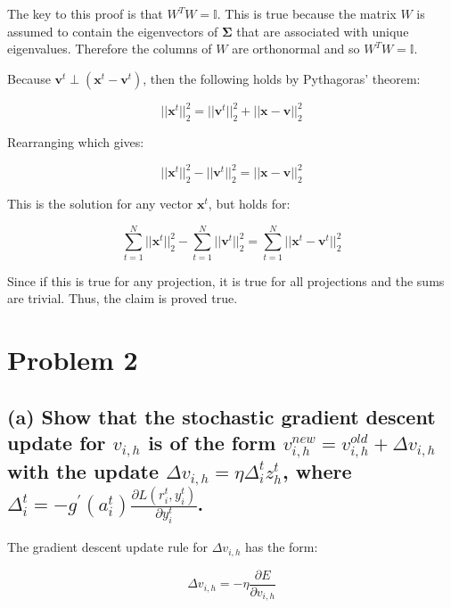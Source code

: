 \documentclass{article}
\begin{document}
The key to this proof is that $W^TW = \mathbb{I}$.  This is true because the matrix $W$ is assumed to contain the eigenvectors of $\mathbf{\Sigma}$ that are associated with unique eigenvalues.  Therefore the columns of $W$ are orthonormal and so $W^TW = \mathbb{I}$.

Because $  \mathbf{v}^t \perp (\mathbf{x}^t - \mathbf{v}^t) $, then the following holds by Pythagoras' theorem:

\begin{equation}
|| \mathbf{x}^t ||_2^2 = || \mathbf{v}^t ||_2^2 + || \mathbf{x} - \mathbf{v} ||_2^2
\end{equation}

Rearranging which gives:

\begin{equation}
|| \mathbf{x}^t ||_2^2 - || \mathbf{v}^t ||_2^2 = || \mathbf{x} - \mathbf{v} ||_2^2
\end{equation}

This is the solution for any vector $\mathbf{x}^t$, but holds for:

\begin{equation}
\sum\limits_{t=1}^N || \mathbf{x}^t ||_2^2 - \sum\limits_{t=1}^N || \mathbf{v}^t ||_2^2 = \sum\limits_{t=1}^N || \mathbf{x}^t - \mathbf{v}^t ||_2^2
\end{equation}

Since if this is true for any projection, it is true for all projections and the sums are trivial. Thus, the claim is proved true.

\section{Problem 2}

\subsection{(a) Show that the stochastic gradient descent update for $v_{i,h}$ is of the form $v_{i,h}^{new} = v_{i,h}^{old} + \Delta v_{i,h}$ with the update $\Delta v_{i,h} = \eta \Delta_i^t z_h^t$, where $\Delta_i^t = -g^{'}(a_i^t) \frac{ \partial L(r_i^t, y_i^t) }{ \partial y_i^t }$.}

The gradient descent update rule for $\Delta v_{i,h}$ has the form:

\begin{equation}
\Delta v_{i,h} = - \eta \frac{\partial E}{\partial v_{i,h} }
\end{equation}
\end{document}
